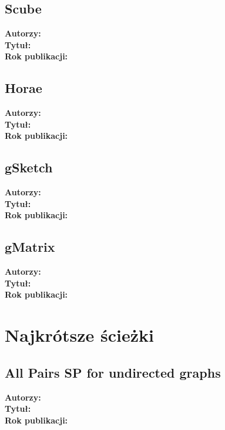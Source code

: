 \documentclass{article}
\begin{document}
        \subsection{Scube\cite{Chen_Zhou_Chen_Jin_2022}}
            \textbf{Autorzy: } \\
            \textbf{Tytuł: } \\
            \textbf{Rok publikacji: } \\

        \subsection{Horae\cite{Chen_Zhou_Chen_Xiao_Jin_Li_2022}}
            \textbf{Autorzy: } \\
            \textbf{Tytuł: } \\
            \textbf{Rok publikacji: } \\
        
        \subsection{gSketch\cite{Zhao_Aggarwal_Wang_2011}}
            \textbf{Autorzy: } \\
            \textbf{Tytuł: } \\
            \textbf{Rok publikacji: } \\
        
        \subsection{gMatrix\cite{Khan_Aggarwal_2016}}
            \textbf{Autorzy: } \\
            \textbf{Tytuł: } \\
            \textbf{Rok publikacji: } \\

    \section{Najkrótsze ścieżki}
        \subsection{All Pairs SP for undirected graphs\cite{Roditty_Zwick_2012}}
            \textbf{Autorzy: } \\
            \textbf{Tytuł: } \\
            \textbf{Rok publikacji: } \\
\end{document}
